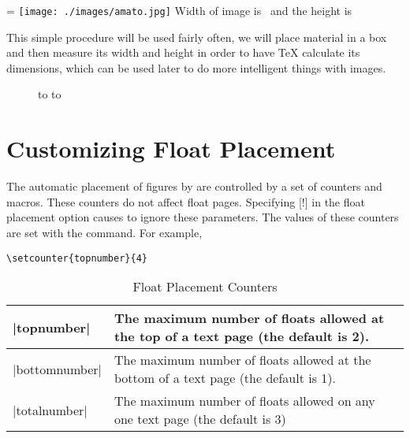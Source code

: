 \begin{scriptexample}{}{}
\setbox\imgbox= \hbox{\texttt{[image: ./images/amato.jpg]}}%
Width of image is \the\wd\imgbox\ and the height is \the\ht\imgbox  
\end{scriptexample}

This simple procedure will be used fairly often, we will place material in a box and then measure its width and height in order to have TeX calculate its dimensions, which can be used later to do more intelligent things with images. 

\begin{figure}[tb]
\ifoddpage
  \hbox to %
\else
  \hbox to %
\fi
\end{figure}


\section{Customizing Float Placement}

The automatic placement of figures by \latexe are controlled by a set of counters and macros. These counters do not affect float pages. Specifying [!] in the float placement option causes \latex to ignore these parameters. The values of these counters are set with the  command. For example,

\begin{verbatim}
\setcounter{topnumber}{4}
\end{verbatim}

\begin{table}[htbp]
\caption{Float Placement Counters}

\begin{tabular}{|l|p{6.5cm}|}
\hline
|topnumber| & The maximum number of floats allowed at the top of a text page (the default is 2).\\
\hline
|bottomnumber| &The maximum number of floats allowed at the bottom of a text
page (the default is 1).\\
\hline
|totalnumber| &The maximum number of floats allowed on any one text page
(the default is 3)\\
\hline
\end{tabular}\par

\end{table}



